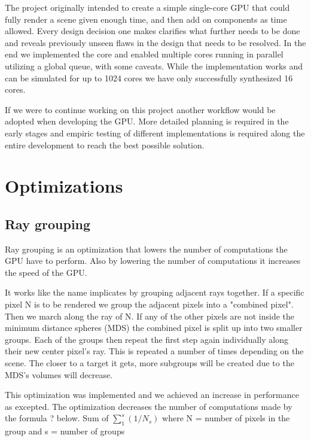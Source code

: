 			The project originally intended to create a simple single-core GPU
			that could fully render a scene given enough time, and then add on
			components as time allowed.
			Every design decision one makes clarifies what further needs to be
			done and reveals previously unseen flaws in the design that needs
			to be resolved. In the end we implemented the core and enabled
			multiple cores running in parallel utilizing a global queue, with
			some caveats. While the implementation works and can be simulated
			for up to 1024 cores we have only successfully synthesized 16 cores. 
			
			If we were to continue working on this project another workflow
			would be adopted when developing the GPU. More detailed planning is 
			required in the early stages and empiric testing of different 
			implementations is required along the entire development to reach
			the best possible solution.

	\section{Optimizations}

		\subsection{Ray grouping}
		
			Ray grouping is an optimization that lowers the number of
			computations the GPU have to perform. Also by lowering the number of
			computations it increases the speed of the GPU.
			
			It works like the name implicates by grouping adjacent rays
			together. If a specific pixel N is to be rendered we group the
			adjacent pixels into a "combined pixel". Then we march along the
			ray of N. If any of the other pixels are not inside the minimum
			distance spheres (MDS) the combined pixel is split up into two
			smaller groups. Each of the groups then repeat the first step again
			individually along their new center pixel's ray. This is repeated a
			number of times depending on the scene.  The closer to a target it
			gets, more subgroups will be created due to the MDS's volumes will
			decrease.
			
			This optimization was implemented and we achieved an increase in
			performance as excepted. The optimization decreases the number of
			computations made by the formula ? below.  Sum of $\sum_1^s(1/N_s)$
			where N = number of pixels in the group and s = number of groups

